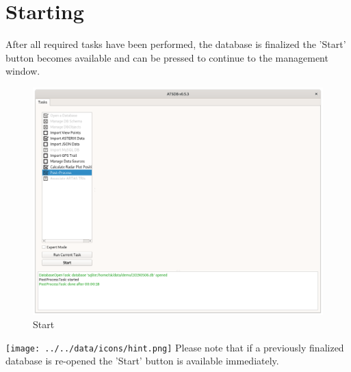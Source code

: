 \section{Starting}
\label{sec:startup_starting}

After all required tasks have been performed, the database is finalized the 'Start' button becomes available and can be pressed to continue to the management window. \\

\begin{figure}[H]
  \hspace*{-2.5cm}
    \includegraphics[width=19cm]{figures/start.png}
  \caption{Start}
\end{figure}

\texttt{[image: ../../data/icons/hint.png]} Please note that if a previously finalized database is re-opened the 'Start' button is available immediately.


